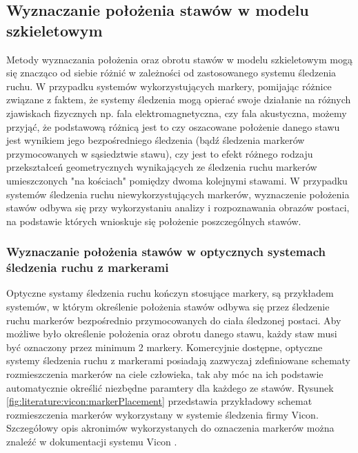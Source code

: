 
		
\subsection{Wyznaczanie położenia stawów w modelu szkieletowym}
Metody wyznaczania położenia oraz obrotu stawów w modelu szkieletowym mogą się znacząco od siebie różnić w zależności od zastosowanego systemu śledzenia ruchu. W przypadku systemów wykorzystujących markery, pomijając różnice związane z faktem, że systemy śledzenia mogą opierać swoje działanie na różnych zjawiskach fizycznych np. fala elektromagnetyczna, czy fala akustyczna, możemy przyjąć, że podstawową różnicą jest to czy oszacowane położenie danego stawu jest wynikiem jego bezpośredniego śledzenia (bądź śledzenia markerów przymocowanych w sąsiedztwie stawu), czy jest to efekt różnego rodzaju przekształceń geometrycznych wynikających ze śledzenia ruchu markerów umieszczonych "na kościach" pomiędzy dwoma kolejnymi stawami. W przypadku systemów śledzenia ruchu niewykorzystujących markerów, wyznaczenie położenia stawów odbywa się przy wykorzystaniu analizy i rozpoznawania obrazów postaci, na podstawie których wnioskuje się położenie poszczególnych stawów.
		
\subsubsection*{Wyznaczanie położenia stawów w optycznych systemach śledzenia ruchu z markerami}
Optyczne systamy śledzenia ruchu kończyn stosujące markery, są przykładem systemów, w którym określenie położenia stawów odbywa się przez śledzenie ruchu markerów bezpośrednio przymocowanych do ciała śledzonej postaci. Aby możliwe było określenie położenia oraz obrotu danego stawu, każdy staw musi być oznaczony przez minimum 2 markery. Komercyjnie dostępne, optyczne systemy śledzenia ruchu z markerami posiadają zazwyczaj zdefiniowane schematy rozmieszczenia markerów na ciele człowieka, tak aby móc na ich podstawie automatycznie określić niezbędne paramtery dla każdego ze stawów. Rysunek \ref{fig:literature:vicon:markerPlacement} przedstawia przykładowy schemat rozmieszczenia markerów wykorzystany w systemie śledzenia firmy Vicon. Szczegółowy opis akronimów wykorzystanych do oznaczenia markerów można znaleźć w dokumentacji systemu Vicon \cite{ViconGaitPlacement}.
		
